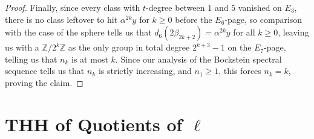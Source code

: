 \documentclass[11pt,leqno]{article}
\newcommand{\zz}{\mathbb{Z}}
\newtheorem*{short hand}{theorem name}
\theoremstyle{plain}  %
\theoremstyle{definition}
\numberwithin{equation}{section}
\begin{document}
\begin{proof}
Finally, since every class with $t$-degree between $1$ and $5$ vanished on $E_3$, there is no class leftover to hit $\alpha^{2k}y$ for $k\geq 0$ before the $E_6$-page, so comparison with the case of the sphere tells us that $d_6(2\beta_{2k+2})=\alpha^{2k}y$ for all $k\geq 0$, leaving us with a $\zz/2^{k}\zz$ as the only group in total degree $2^{k+3}-1$ on the $E_7$-page, telling us that $n_k$ is at most $k$.  Since our analysis of the Bockstein spectral sequence tells us that $n_k$ is strictly increasing, and $n_1\geq 1$, this forces $n_k=k$, proving the claim.
\end{proof}

\newpage
\section{THH of Quotients of $\ell$}
\end{document}
